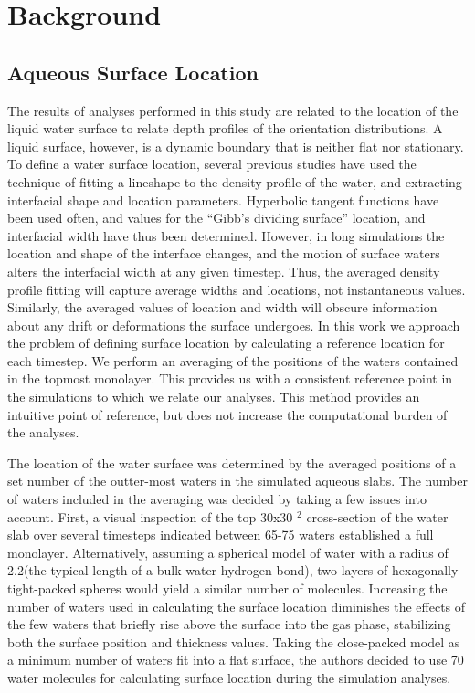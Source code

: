 \section{Background}

\subsection {Aqueous Surface Location}

	The results of analyses performed in this study are related to the location of the liquid water surface to relate depth profiles of the orientation distributions. A liquid surface, however, is a dynamic boundary that is neither flat nor stationary. To define a water surface location, several previous studies have used the technique of fitting a lineshape to the density profile of the water, and extracting interfacial shape and location parameters.\cite{Shamay2010,Wick2006c,Chowdhary2006} Hyperbolic tangent functions have been used often, and values for the ``Gibb's dividing surface'' location, and interfacial width have thus been determined.\cite{Matsumoto1988} However, in long simulations the location and shape of the interface changes, and the motion of surface waters alters the interfacial width at any given timestep. Thus, the averaged density profile fitting will capture average widths and locations, not instantaneous values. Similarly, the averaged values of location and width will obscure information about any drift or deformations the surface undergoes. In this work we approach the problem of defining surface location by calculating a reference location for each timestep. We perform an averaging of the positions of the waters contained in the topmost monolayer. This provides us with a consistent reference point in the simulations to which we relate our analyses. This method provides an intuitive point of reference, but does not increase the computational burden of the analyses.


  The location of the water surface was determined by the averaged positions of a set number of the outter-most waters in the simulated aqueous slabs. The number of waters included in the averaging was decided by taking a few issues into account. First, a visual inspection of the top 30x30 \angs$^2$ cross-section of the water slab over several timesteps indicated between 65-75 waters established a full monolayer. Alternatively, assuming a spherical model of water with a radius of 2.2\angs (the typical length of a bulk-water hydrogen bond), two layers of hexagonally tight-packed spheres would yield a similar number of molecules. Increasing the number of waters used in calculating the surface location diminishes the effects of the few waters that briefly rise above the surface into the gas phase, stabilizing both the surface position and thickness values. Taking the close-packed model as a minimum number of waters fit into a flat surface, the authors decided to use 70 water molecules for calculating surface location during the simulation analyses.
  
